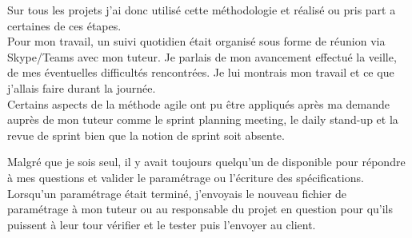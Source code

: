 Sur tous les projets j'ai donc utilisé cette méthodologie et réalisé ou pris part a certaines de ces étapes.\\

Pour mon travail, un suivi quotidien était organisé sous forme de réunion via Skype/Teams avec mon tuteur. Je parlais de mon avancement effectué la veille, de mes éventuelles difficultés rencontrées. Je lui montrais mon travail et ce que j'allais faire durant la journée.\\

Certains aspects de la méthode agile ont pu être appliqués après ma demande auprès de mon tuteur comme le sprint planning meeting, le daily stand-up et la revue de sprint bien que la notion de sprint soit absente.

Malgré que je sois seul, il y avait toujours quelqu'un de disponible pour répondre à mes questions et valider le paramétrage ou l'écriture des spécifications.\\

Lorsqu'un paramétrage était terminé, j'envoyais le nouveau fichier de paramétrage à mon tuteur ou au responsable du projet en question pour qu'ils puissent à leur tour vérifier et le tester puis l'envoyer au client.\\